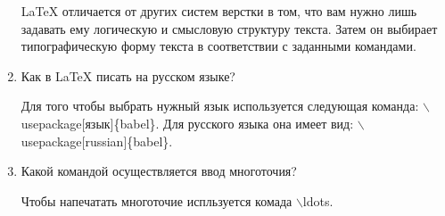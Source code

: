 \documentclass[a4paper,12pt]{article} %
\begin{document}
\begin{enumerate}
    LaTeX отличается от других систем верстки в том, что вам нужно лишь задавать ему логическую и смысловую структуру текста. Затем он выбирает типографическую форму текста в соответствии с заданными командами.
    
    \item Как в LaTeX писать на русском языке?
    
    Для того чтобы выбрать нужный язык используется следующая команда: $\backslash$usepackage[язык]\{babel\}. Для русского языка она имеет вид:
     $\backslash$usepackage[russian]\{babel\}.
     
    \item Какой командой осуществляется ввод многоточия?
    
    Чтобы напечатать многоточие испльзуется комада $\backslash$ldots.
    
\end{enumerate}
\end{document}
